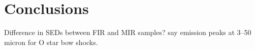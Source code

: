 
\section{Conclusions}
\label{sec:conclusion}

Difference in SEDs between FIR and MIR samples?  \citet{Meyer:2016a}
say emission peaks at 3--50 micron for O star bow shocks.


